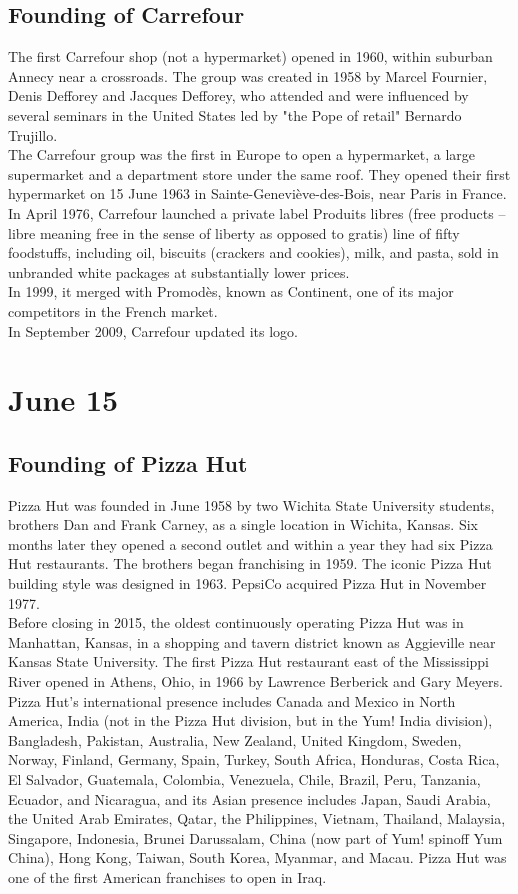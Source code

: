 \documentclass[11pt]{report}
\begin{document}
\subsection{Founding of Carrefour}
The first Carrefour shop (not a hypermarket) opened in 1960, within suburban Annecy near a crossroads. The group was created in 1958 by Marcel Fournier, Denis Defforey and Jacques Defforey, who attended and were influenced by several seminars in the United States led by "the Pope of retail" Bernardo Trujillo.\\ \indent The Carrefour group was the first in Europe to open a hypermarket, a large supermarket and a department store under the same roof. They opened their first hypermarket on 15 June 1963 in Sainte-Geneviève-des-Bois, near Paris in France.\\ \indent In April 1976, Carrefour launched a private label Produits libres (free products – libre meaning free in the sense of liberty as opposed to gratis) line of fifty foodstuffs, including oil, biscuits (crackers and cookies), milk, and pasta, sold in unbranded white packages at substantially lower prices.\\ \indent In 1999, it merged with Promodès, known as Continent, one of its major competitors in the French market.\\ \indent In September 2009, Carrefour updated its logo.
\section{June 15}
\subsection{Founding of Pizza Hut}
Pizza Hut was founded in June 1958 by two Wichita State University students, brothers Dan and Frank Carney, as a single location in Wichita, Kansas. Six months later they opened a second outlet and within a year they had six Pizza Hut restaurants. The brothers began franchising in 1959. The iconic Pizza Hut building style was designed in 1963. PepsiCo acquired Pizza Hut in November 1977.\\ \indent Before closing in 2015, the oldest continuously operating Pizza Hut was in Manhattan, Kansas, in a shopping and tavern district known as Aggieville near Kansas State University. The first Pizza Hut restaurant east of the Mississippi River opened in Athens, Ohio, in 1966 by Lawrence Berberick and Gary Meyers.\\ \indent Pizza Hut's international presence includes Canada and Mexico in North America, India (not in the Pizza Hut division, but in the Yum! India division), Bangladesh, Pakistan, Australia, New Zealand, United Kingdom, Sweden, Norway, Finland, Germany, Spain, Turkey, South Africa, Honduras, Costa Rica, El Salvador, Guatemala, Colombia, Venezuela, Chile, Brazil, Peru, Tanzania, Ecuador, and Nicaragua, and its Asian presence includes Japan, Saudi Arabia, the United Arab Emirates, Qatar, the Philippines, Vietnam, Thailand, Malaysia, Singapore, Indonesia, Brunei Darussalam, China (now part of Yum! spinoff Yum China), Hong Kong, Taiwan, South Korea, Myanmar, and Macau. Pizza Hut was one of the first American franchises to open in Iraq.
\end{document}
